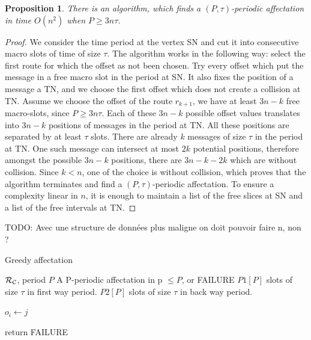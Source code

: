 \documentclass[a4paper,10pt]{article}
\newtheorem{proposition}{Proposition}
\newcommand{\todo}[1]{{\color{red} TODO: {#1}}}
\begin{document}
    \begin{proposition}
    There is an algorithm, which finds a $(P,\tau)$-periodic affectation in time $O(n^2)$ when $P \geq 3n\tau$.
    \end{proposition}
    \begin{proof}
     We consider the time period at the vertex SN and cut it into consecutive macro slots of time of size $\tau$. The algorithm works in the following way: select the first route for which the offset as not been chosen. Try every offset which put the message in a  
     free macro slot in the period at SN. It also fixes the position of a message a TN, and we choose the first offset which does not create a collision at TN. 
     Assume we choose the offset of the route $r_{k+1}$, we have  at least $3n - k$ free macro-slots, since $P \geq 3n\tau$. Each of these $3n - k$ possible offset values translates into $3n - k$ positions of messages in the period at TN. All these positions are separated by at least $\tau$ slots. There are already $k$ messages of size $\tau$ in the period at TN. One such message can intersect at most $2k$ potential positions, therefore  amongst the possible $3n - k$ positions, there are  $3n - k -2k$ which are without collision. Since $k < n$, one of the choice is without collision, which proves that the algorithm terminates and find a
     $(P,\tau)$-periodic affectation. To ensure a complexity linear in $n$, it is enough to maintain a list of the free slices at SN and a list of the free intervals at TN. 
    \end{proof}

    \todo{Avec une structure de données plus maligne on doit pouvoir faire n, non ?}
   
	\begin{algorithm}[H]
	\caption{Greedy affectation}
	\begin{algorithmic}
	\REQUIRE ${\cal R}_{\cal C}$, period $P$
	\ENSURE A P-periodic affectation in p $\leq P$, or FAILURE
	\STATE $P1[P]$ slots of size $\tau$ in first way period.
	\STATE $P2[P]$ slots  of size $\tau$ in back way period.



	
	\STATE $o_i \leftarrow j$
	\ENDIF


	\STATE return FAILURE
	\ENDIF
	\ENDFOR

	\ENDFOR

	\end{algorithmic}
	\end{algorithm}
\end{document}
